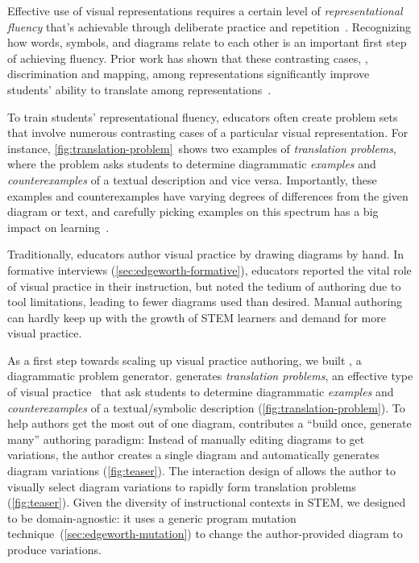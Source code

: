 Effective use of visual representations requires a certain level of \emph{representational fluency} that's achievable through deliberate practice and repetition~\cite{metarepresentation, representationalFluency}. Recognizing how words, symbols, and diagrams relate to each other is an important first step of achieving fluency. Prior work has shown that these contrasting cases, \ie, discrimination and mapping, among representations significantly improve students' ability to translate among representations~\cite{perceptualLearning}.

To train students' representational fluency, educators often create problem sets that involve numerous contrasting cases of a particular visual representation. For instance, \cref{fig:translation-problem}~shows two examples of \emph{translation problems}, where the problem asks students to determine diagrammatic \emph{examples} and \emph{counterexamples} of a textual description and vice versa. Importantly, these examples and counterexamples have varying degrees of differences from the given diagram or text, and carefully picking examples on this spectrum has a big impact on learning~\cite{samenessAndDifference}.

Traditionally, educators author visual practice by drawing diagrams by hand. In formative interviews (\cref{sec:edgeworth-formative}), educators reported the vital role of visual practice in their instruction, but noted the tedium of authoring due to tool limitations, leading to fewer diagrams used than desired. Manual authoring can hardly keep up with the growth of STEM learners and demand for more visual practice.

As a first step towards scaling up visual practice authoring, we built \Edgeworth, a diagrammatic problem generator. \Edgeworth generates \emph{translation problems}, an effective type of visual practice~\cite{perceptualLearning} that ask students to determine diagrammatic \emph{examples} and \emph{counterexamples} of a textual/symbolic description (\cref{fig:translation-problem}). To help authors get the most out of one diagram, \Edgeworth contributes a ``build once, generate many'' authoring paradigm: Instead of manually editing diagrams to get variations, the author creates a single diagram and \Edgeworth automatically generates diagram variations (\cref{fig:teaser}). The interaction design of \Edgeworth allows the author to visually select diagram variations to rapidly form translation problems (\cref{fig:teaser}). Given the diversity of instructional contexts in STEM, we designed \Edgeworth to be domain-agnostic: it uses a generic program mutation technique~(\cref{sec:edgeworth-mutation}) to change the author-provided diagram to produce variations. 

